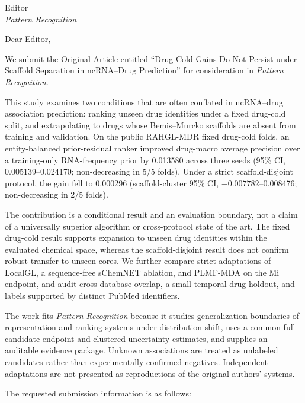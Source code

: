 \documentclass[11pt]{letter}
\date{20 October 2026}
\begin{document}
\begin{letter}{Editor\\\textit{Pattern Recognition}}
\opening{Dear Editor,}

We submit the Original Article entitled ``Drug-Cold Gains Do Not Persist under Scaffold Separation in ncRNA--Drug Prediction'' for consideration in \textit{Pattern Recognition}.

This study examines two conditions that are often conflated in ncRNA--drug association prediction: ranking unseen drug identities under a fixed drug-cold split, and extrapolating to drugs whose Bemis--Murcko scaffolds are absent from training and validation. On the public RAHGL-MDR fixed drug-cold folds, an entity-balanced prior-residual ranker improved drug-macro average precision over a training-only RNA-frequency prior by 0.013580 across three seeds (95\% CI, 0.005139--0.024170; non-decreasing in 5/5 folds). Under a strict scaffold-disjoint protocol, the gain fell to 0.000296 (scaffold-cluster 95\% CI, $-0.007782$--0.008476; non-decreasing in 2/5 folds).

The contribution is a conditional result and an evaluation boundary, not a claim of a universally superior algorithm or cross-protocol state of the art. The fixed drug-cold result supports expansion to unseen drug identities within the evaluated chemical space, whereas the scaffold-disjoint result does not confirm robust transfer to unseen cores. We further compare strict adaptations of LocalGL, a sequence-free sChemNET ablation, and PLMF-MDA on the Mi endpoint, and audit cross-database overlap, a small temporal-drug holdout, and labels supported by distinct PubMed identifiers.

The work fits \textit{Pattern Recognition} because it studies generalization boundaries of representation and ranking systems under distribution shift, uses a common full-candidate endpoint and clustered uncertainty estimates, and supplies an auditable evidence package. Unknown associations are treated as unlabeled candidates rather than experimentally confirmed negatives. Independent adaptations are not presented as reproductions of the original authors' systems.

The requested submission information is as follows:


\end{letter}
\end{document}
